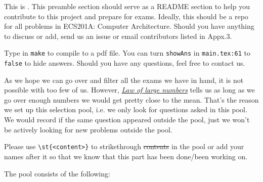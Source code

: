 This is \name. 
This preamble section should serve as a README section to help you contribute to this project and prepare for exams.
Ideally, this should be a repo for all problems in ECS201A: Computer Architecture.
Should you have anything to discuss or add, send us an issue or email contributors listed in Appx.3.


Type in \lstinline{make} to compile to a pdf file. 
You can turn \lstinline{showAns} in \texttt{main.tex:61} to \lstinline{false} to hide answers.
Should you have any questions, feel free to contact us.


As we hope we can go over and filter all the exams we have in hand, it is not possible with too few of us.
However, \href{https://en.wikipedia.org/wiki/Law_of_large_numbers}{\textit{Law of large numbers}} tells us as long as we go over enough numbers we would get pretty close to the mean.
That's the reason we set up this selection pool, i.e. we only look for questions asked in this pool. 
We would record if the same question appeared outside the pool, just we won't be actively looking for new problems outside the pool.

Please use \lstinline|\st{<content>}| to strikethrough \st{contents} in the pool or add your names after it so that we know that this part has been done/been working on.

The pool consists of the following:

